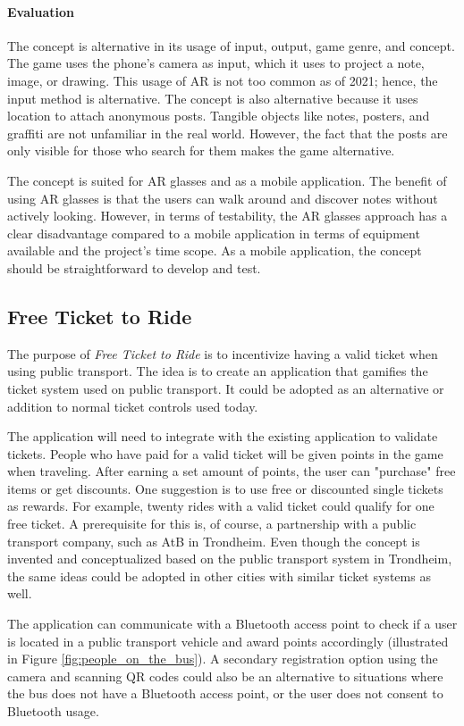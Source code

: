 \paragraph*{Evaluation} 
The concept is alternative in its usage of input, output, game genre, and concept. The game uses the phone’s camera as input, which it uses to project a note, image, or drawing. This usage of AR is not too common as of 2021; hence, the input method is alternative. The concept is also alternative because it uses location to attach anonymous posts. Tangible objects like notes, posters, and graffiti are not unfamiliar in the real world. However, the fact that the posts are only visible for those who search for them makes the game alternative.

The concept is suited for AR glasses and as a mobile application. The benefit of using AR glasses is that the users can walk around and discover notes without actively looking. However, in terms of testability, the AR glasses approach has a clear disadvantage compared to a mobile application in terms of equipment available and the project’s time scope. As a mobile application, the concept should be straightforward to develop and test.

\subsection{Free Ticket to Ride}
The purpose of \textit{Free Ticket to Ride} is to incentivize having a valid ticket when using public transport. The idea is to create an application that gamifies the ticket system used on public transport. It could be adopted as an alternative or addition to normal ticket controls used today.

The application will need to integrate with the existing application to validate tickets. People who have paid for a valid ticket will be given points in the game when traveling. After earning a set amount of points, the user can "purchase" free items or get discounts. One suggestion is to use free or discounted single tickets as rewards. For example, twenty rides with a valid ticket could qualify for one free ticket. A prerequisite for this is, of course, a partnership with a public transport company, such as AtB in Trondheim. Even though the concept is invented and conceptualized based on the public transport system in Trondheim, the same ideas could be adopted in other cities with similar ticket systems as well.

The application can communicate with a Bluetooth access point to check if a user is located in a public transport vehicle and award points accordingly (illustrated in Figure \ref{fig:people_on_the_bus}). A secondary registration option using the camera and scanning QR codes could also be an alternative to situations where the bus does not have a Bluetooth access point, or the user does not consent to Bluetooth usage.

